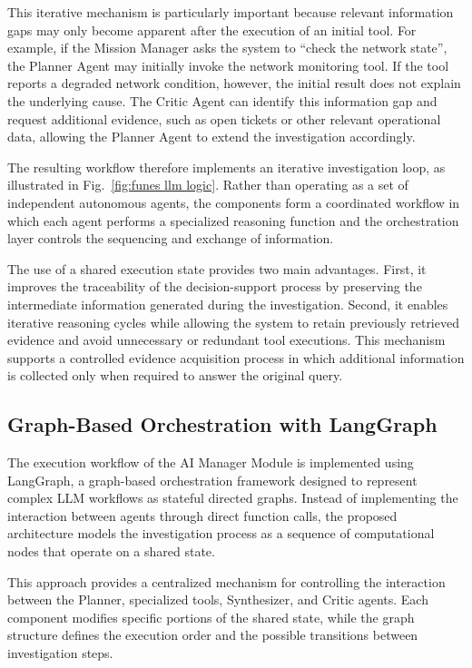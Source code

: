 This iterative mechanism is particularly important because relevant information gaps may only become apparent after the execution of an initial tool. For example, if the Mission Manager asks the system to ``check the network state'', the Planner Agent may initially invoke the network monitoring tool. If the tool reports a degraded network condition, however, the initial result does not explain the underlying cause. The Critic Agent can identify this information gap and request additional evidence, such as open tickets or other relevant operational data, allowing the Planner Agent to extend the investigation accordingly.

The resulting workflow therefore implements an iterative investigation loop, as illustrated in Fig.~\ref{fig:funes llm logic}. Rather than operating as a set of independent autonomous agents, the components form a coordinated workflow in which each agent performs a specialized reasoning function and the orchestration layer controls the sequencing and exchange of information.

The use of a shared execution state provides two main advantages. First, it improves the traceability of the decision-support process by preserving the intermediate information generated during the investigation. Second, it enables iterative reasoning cycles while allowing the system to retain previously retrieved evidence and avoid unnecessary or redundant tool executions. This mechanism supports a controlled evidence acquisition process in which additional information is collected only when required to answer the original query.

 
\subsection{Graph-Based Orchestration with LangGraph}

The execution workflow of the AI Manager Module is implemented using LangGraph, a graph-based orchestration framework designed to represent complex LLM workflows as stateful directed graphs. 
Instead of implementing the interaction between agents through direct function calls, the proposed architecture models the investigation process as a sequence of computational nodes that operate on a shared state.

This approach provides a centralized mechanism for controlling the interaction between the Planner, specialized tools, Synthesizer, and Critic agents. Each component modifies specific portions of the shared state, while the graph structure defines the execution order and the possible transitions between investigation steps.

